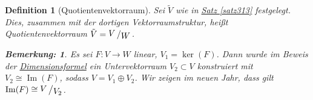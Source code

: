 \documentclass{report}
\DeclareMathOperator{\Ima}{Im}
\theoremstyle{customrem}
\newtheorem*{bem}{Bemerkung\textnormal:}
\theoremstyle{customdef}
\newtheorem{definition}{Definition}[chapter]
\newcommand{\bigslant}[2]{{\raisebox{.1em}{$#1$}\left/\raisebox{-.2em}{$#2$}\right.}}
\begin{document}
	\begin{definition}[Quotientenvektorraum]
		Sei $\tilde{V}$ wie in \hyperref[satz313]{Satz \ref{satz313}} festgelegt. Dies, zusammen mit der dortigen Vektorraumstruktur, heißt Quotientenvektorraum $\tilde{V} = \bigslant{V}{W}$.\\
		\begin{bem}
			Es sei $F:V\to W$ linear, $V_1 = \ker(F)$. Dann wurde im Beweis der \hyperref[satz37]{Dimensionsformel} ein Untervektorraum $V_2\subset V$ konstruiert mit $V_2 \cong \Ima(F)$, sodass $V = V_1\oplus V_2$. Wir zeigen im neuen Jahr, dass gilt $\Ima(F)\cong \bigslant{V}{V_2}$.
		\end{bem}
	\end{definition}
	
\newpage
\renewcommand{\listtheoremname}{Satz- und Definitionsverzeichnis}
\listoftheorems[ignoreall, show={definition}, show={satz}, show={lemma}]
\newpage
\printindex
\end{document}

